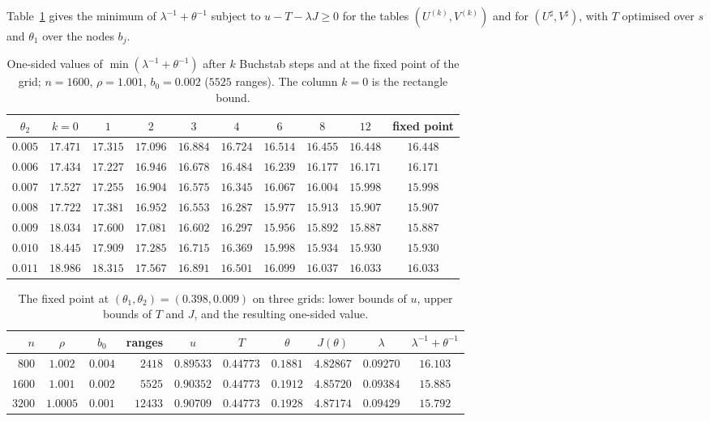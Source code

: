 \documentclass[11pt,a4paper]{amsart}
\theoremstyle{remark}
\numberwithin{equation}{section}
\begin{document}
Table~\ref{tab:ksteps} gives the minimum of $\lambda^{-1}+\theta^{-1}$ subject to $u-T-\lambda J\ge0$ for the tables
$(U^{(k)},V^{(k)})$ and for $(U^\sharp,V^\sharp)$, with $T$ optimised over $s$ and $\theta_1$ over the nodes $b_j$.

\begin{table}[htbp]
\centering\small
\begin{tabular}{cccccccccc}
\toprule
$\theta_2$ & $k=0$ & $1$ & $2$ & $3$ & $4$ & $6$ & $8$ & $12$ & fixed point\\
\midrule
$0.005$ & $17.471$ & $17.315$ & $17.096$ & $16.884$ & $16.724$ & $16.514$ & $16.455$ & $16.448$ & $16.448$\\
$0.006$ & $17.434$ & $17.227$ & $16.946$ & $16.678$ & $16.484$ & $16.239$ & $16.177$ & $16.171$ & $16.171$\\
$0.007$ & $17.527$ & $17.255$ & $16.904$ & $16.575$ & $16.345$ & $16.067$ & $16.004$ & $15.998$ & $15.998$\\
$0.008$ & $17.722$ & $17.381$ & $16.952$ & $16.553$ & $16.287$ & $15.977$ & $15.913$ & $15.907$ & $15.907$\\
$0.009$ & $18.034$ & $17.600$ & $17.081$ & $16.602$ & $16.297$ & $15.956$ & $15.892$ & $15.887$ & $15.887$\\
$0.010$ & $18.445$ & $17.909$ & $17.285$ & $16.715$ & $16.369$ & $15.998$ & $15.934$ & $15.930$ & $15.930$\\
$0.011$ & $18.986$ & $18.315$ & $17.567$ & $16.891$ & $16.501$ & $16.099$ & $16.037$ & $16.033$ & $16.033$\\
\bottomrule
\end{tabular}
\caption{One-sided values of $\min(\lambda^{-1}+\theta^{-1})$ after $k$ Buchstab steps and at the fixed point of
the grid; $n=1600$, $\rho=1.001$, $b_0=0.002$ ($5525$ ranges). The column $k=0$ is the rectangle bound.}
\label{tab:ksteps}
\end{table}

\begin{table}[htbp]
\centering\small\setlength{\tabcolsep}{4pt}
\begin{tabular}{rccrcccccc}
\toprule
$n$ & $\rho$ & $b_0$ & ranges & $u$ & $T$ & $\theta$ & $J(\theta)$ & $\lambda$ & $\lambda^{-1}+\theta^{-1}$\\
\midrule
$800$ & $1.002$ & $0.004$ & $2418$ & $0.89533$ & $0.44773$ & $0.1881$ & $4.82867$ & $0.09270$ & $16.103$\\
$1600$ & $1.001$ & $0.002$ & $5525$ & $0.90352$ & $0.44773$ & $0.1912$ & $4.85720$ & $0.09384$ & $15.885$\\
$3200$ & $1.0005$ & $0.001$ & $12433$ & $0.90709$ & $0.44773$ & $0.1928$ & $4.87174$ & $0.09429$ & $15.792$\\
\bottomrule
\end{tabular}
\caption{The fixed point at $(\theta_1,\theta_2)=(0.398,0.009)$ on three grids: lower bounds of $u$, upper bounds
of $T$ and $J$, and the resulting one-sided value.}
\label{tab:grids}
\end{table}
\end{document}
